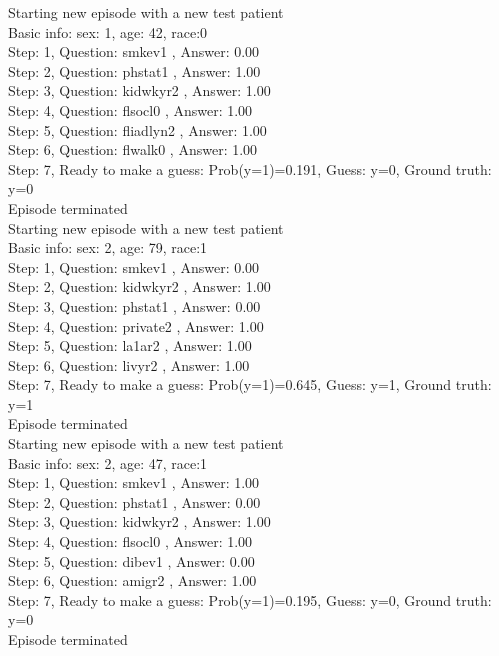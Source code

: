 \documentclass[reqno,11pt]{article}
\begin{document}
\noindent Starting new episode with a new test patient \\ [0.5ex] 
Basic info: sex: 1, age: 42, race:0 \\ [0.5ex] 
Step: 1, Question:  smkev1 , Answer: 0.00 \\ [0.5ex] 
Step: 2, Question:  phstat1 , Answer: 1.00 \\ [0.5ex] 
Step: 3, Question:  kidwkyr2 , Answer: 1.00 \\ [0.5ex] 
Step: 4, Question:  flsocl0 , Answer: 1.00 \\ [0.5ex] 
Step: 5, Question:  fliadlyn2 , Answer: 1.00 \\ [0.5ex] 
Step: 6, Question:  flwalk0 , Answer: 1.00 \\ [0.5ex] 
Step: 7, Ready to make a guess: Prob(y=1)=0.191, Guess: y=0, Ground truth: y=0 \\ [0.5ex] 
Episode terminated \\ [0.5ex] 

\noindent Starting new episode with a new test patient \\ [0.5ex] 
Basic info: sex: 2, age: 79, race:1 \\ [0.5ex] 
Step: 1, Question:  smkev1 , Answer: 0.00 \\ [0.5ex] 
Step: 2, Question:  kidwkyr2 , Answer: 1.00 \\ [0.5ex] 
Step: 3, Question:  phstat1 , Answer: 0.00 \\ [0.5ex] 
Step: 4, Question:  private2 , Answer: 1.00 \\ [0.5ex] 
Step: 5, Question:  la1ar2 , Answer: 1.00 \\ [0.5ex] 
Step: 6, Question:  livyr2 , Answer: 1.00 \\ [0.5ex] 
Step: 7, Ready to make a guess: Prob(y=1)=0.645, Guess: y=1, Ground truth: y=1 \\ [0.5ex] 
Episode terminated \\ [0.5ex] 

\noindent Starting new episode with a new test patient \\ [0.5ex] 
Basic info: sex: 2, age: 47, race:1 \\ [0.5ex] 
Step: 1, Question:  smkev1 , Answer: 1.00 \\ [0.5ex] 
Step: 2, Question:  phstat1 , Answer: 0.00 \\ [0.5ex] 
Step: 3, Question:  kidwkyr2 , Answer: 1.00 \\ [0.5ex] 
Step: 4, Question:  flsocl0 , Answer: 1.00 \\ [0.5ex] 
Step: 5, Question:  dibev1 , Answer: 0.00 \\ [0.5ex] 
Step: 6, Question:  amigr2 , Answer: 1.00 \\ [0.5ex] 
Step: 7, Ready to make a guess: Prob(y=1)=0.195, Guess: y=0, Ground truth: y=0 \\ [0.5ex] 
Episode terminated \\ [0.5ex] 
\end{document}
